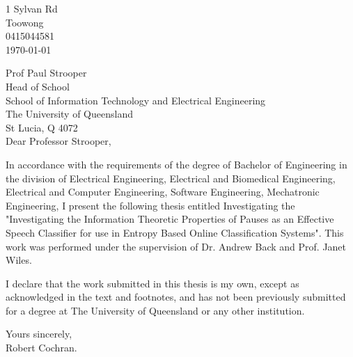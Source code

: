 \begin{flushright}
	1 Sylvan Rd\\
	Toowong\\
	0415044581\\
	\medskip
	\today
\end{flushright}
\begin{flushleft}
  Prof Paul Strooper\\
  Head of School\\
  School of Information Technology and Electrical Engineering\\
  The University of Queensland\\
  St Lucia, Q 4072\\
  \bigskip\bigskip
  Dear Professor Strooper,
\end{flushleft}

In accordance with the requirements of the degree of Bachelor of
Engineering in the division of 
Electrical Engineering,
Electrical and Biomedical Engineering,
Electrical and Computer Engineering,
Software Engineering,
Mechatronic Engineering,
I present the
following thesis entitled Investigating the "Investigating the Information Theoretic Properties of Pauses as an Effective Speech Classifier for use in Entropy Based Online Classification Systems".  This work was performed under the supervision of
Dr. Andrew Back and Prof. Janet Wiles.

I declare that the work submitted in this thesis is my own, except as
acknowledged in the text and footnotes, and has not been previously
submitted for a degree at The University of Queensland or any other
institution.

\begin{flushright}
	Yours sincerely,\\
	\medskip
	\medskip
	Robert Cochran.
\end{flushright}

\cleardoublepage